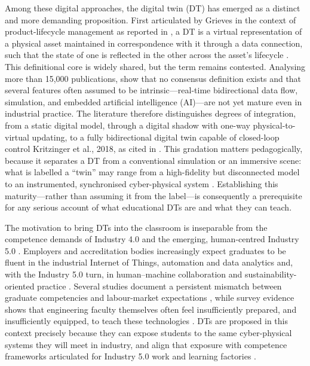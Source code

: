 Among these digital approaches, the digital twin (DT) has emerged as a distinct
and more demanding proposition. First articulated by Grieves in the
context of product-lifecycle management as reported in \cite{liljaniemi_using_2020}, a DT is a virtual representation of a physical asset
maintained in correspondence with it through a data connection, such that the
state of one is reflected in the other across the asset's lifecycle
\cite{de_larmelina_conceptualizing_2026,weichbroth_toward_2024}. This definitional core is widely shared, but the term
remains contested. Analysing more than 15,000 publications, \cite{abdelrahman_what_2025} show that no consensus definition exists and that several features often
assumed to be intrinsic---real-time bidirectional data flow, simulation, and
embedded artificial intelligence (AI)---are not yet mature even in industrial
practice. The literature therefore distinguishes degrees of integration, from a
static digital model, through a digital shadow with one-way physical-to-virtual
updating, to a fully bidirectional digital twin capable of closed-loop control
Kritzinger et al., 2018, as cited in \cite{liljaniemi_using_2020,abdelrahman_what_2025,bokhtiar_al_zami_digital_2025}. This gradation matters pedagogically, because it
separates a DT from a conventional simulation or an immersive scene: what is
labelled a ``twin'' may range from a high-fidelity but disconnected model to an
instrumented, synchronised cyber-physical system \cite{kabir_digital_2025,lee_digital_2025}. Establishing this maturity---rather than assuming it from the
label---is consequently a prerequisite for any serious account of what educational
DTs are and what they can teach.

The motivation to bring DTs into the classroom is inseparable from the competence
demands of Industry 4.0 and the emerging, human-centred Industry 5.0
\cite{saini_industry_2026,kabir_digital_2025}. Employers and accreditation bodies
increasingly expect graduates to be fluent in the industrial Internet of Things,
automation and data analytics and, with the Industry 5.0 turn, in human--machine
collaboration and sustainability-oriented practice \cite{sell_international_2025,azofeifa_top_2025,dautaj_importance_2026}. Several studies document a
persistent mismatch between graduate competencies and labour-market expectations
\cite{denissova_factors_2026}, while survey evidence shows that engineering faculty
themselves often feel insufficiently prepared, and insufficiently equipped, to
teach these technologies \cite{cuperman_academic_2026}. DTs are proposed in this
context precisely because they can expose students to the same
cyber-physical systems they will meet in industry, and align that exposure
with competence frameworks articulated for Industry 5.0 work and learning
factories \cite{zare_engineering_2026,nitu_engineering_2026,al-jumeily_implementing_2026}.


